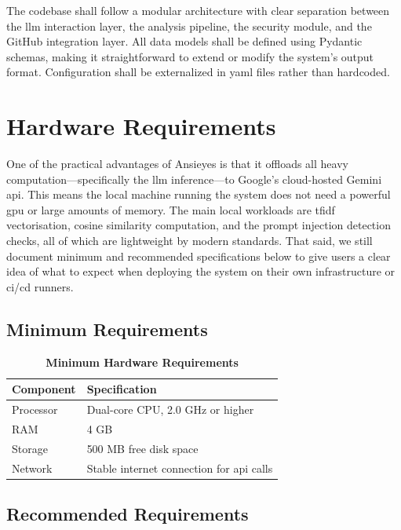 The codebase shall follow a modular architecture with clear separation between the \gls{llm} interaction layer, the analysis pipeline, the security module, and the GitHub integration layer. All data models shall be defined using Pydantic schemas, making it straightforward to extend or modify the system's output format. Configuration shall be externalized in \gls{yaml} files rather than hardcoded.

\section{Hardware Requirements}

One of the practical advantages of Ansieyes is that it offloads all heavy computation---specifically the \gls{llm} inference---to Google's cloud-hosted Gemini \gls{api}. This means the local machine running the system does not need a powerful \gls{gpu} or large amounts of memory. The main local workloads are \gls{tfidf} vectorisation, cosine similarity computation, and the prompt injection detection checks, all of which are lightweight by modern standards. That said, we still document minimum and recommended specifications below to give users a clear idea of what to expect when deploying the system on their own infrastructure or \gls{ci}/\gls{cd} runners.

\subsection{Minimum Requirements}

\begin{table}[H]
\centering
\renewcommand{\arraystretch}{1.3}
\setlength{\arrayrulewidth}{0.5mm}
\caption[Minimum Hardware Requirements]{\textbf{Minimum Hardware Requirements}}
\vspace{2mm}
\begin{tabular}{|p{4cm}|p{8cm}|}
\hline
\textbf{Component} & \textbf{Specification} \\
\hline
Processor & Dual-core CPU, 2.0 GHz or higher \\
\hline
RAM & 4 GB \\
\hline
Storage & 500 MB free disk space \\
\hline
Network & Stable internet connection for \gls{api} calls \\
\hline
\end{tabular}
\end{table}

\subsection{Recommended Requirements}

